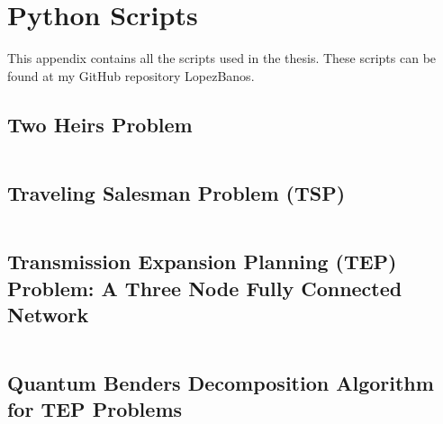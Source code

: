 
\chapter{Python Scripts} %

This appendix contains all the scripts used in the thesis. These scripts can be found at my GitHub repository LopezBanos.
\label{AppendixD} %
\section{Two Heirs Problem}
\inputminted[linenos]{python}{_scripts/Two_Heirs.py}
\section{Traveling Salesman Problem (TSP)}
\inputminted[linenos]{python}{_scripts/tsp_simulated_annealing.py}
\section{Transmission Expansion Planning (TEP) Problem: A Three Node Fully Connected Network}
\inputminted[linenos]{python}{_scripts/SingleDemand_ThreeNode_CQM.py}
\section{Quantum Benders Decomposition Algorithm for TEP Problems}